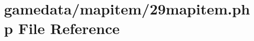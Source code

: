 \hypertarget{29mapitem_8php}{\section{gamedata/mapitem/29mapitem.php File Reference}
\label{29mapitem_8php}
}
